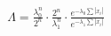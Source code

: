 \documentclass[preview]{standalone}
\begin{document}
\begin{align*}
\Lambda = \frac{\lambda_0^n}{2^n} \cdot \frac{2^n}{\lambda_1^n} \cdot \frac{e^{-\lambda_0\sum |x_i|}}{e^{-\lambda_1\sum |x_i|}}
\end{align*}
\end{document}

